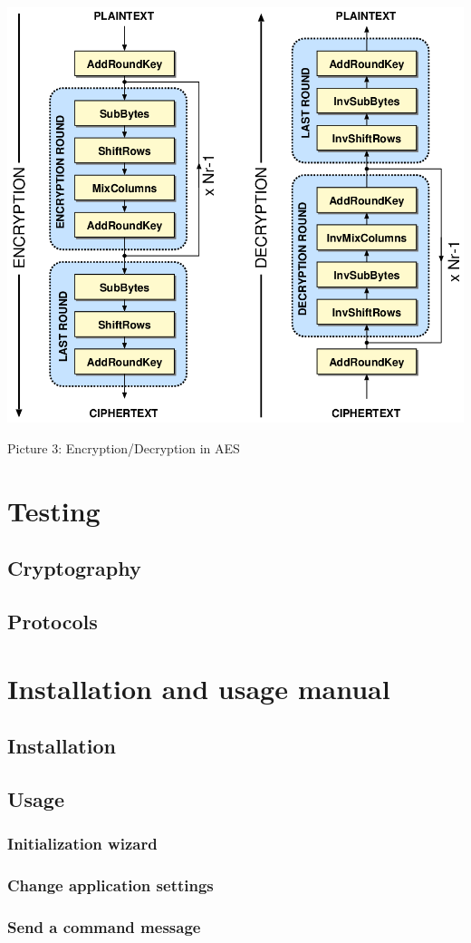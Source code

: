 \documentclass[a4paper,12pt]{article}
\begin{document}
\begin{center}
\vspace{2cm}
\includegraphics[scale=0.3]{images/aes}

\vspace{0.5cm}
Picture 3: Encryption/Decryption in AES\\
\end{center}
\clearpage

\noindent
\Huge{\section{Testing}}
\subsection{Cryptography}
\subsection{Protocols}
\clearpage

\noindent
\Huge{\section{Installation and usage manual}}
\subsection{Installation}
\subsection{Usage}
\subsubsection{Initialization wizard}
\subsubsection{Change application settings}
\subsubsection{Send a command message}
\clearpage
\end{document}
